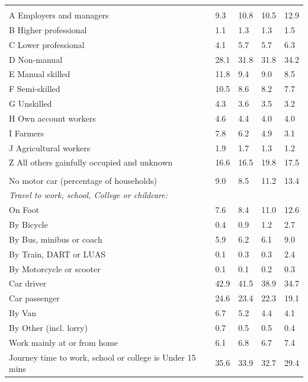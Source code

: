 \documentclass{article}
\begin{document}
\begin{table}[h]
\begin{tabular}{KTTTT}
\hline
    \\ 
    \hline
A Employers and managers &  9.3& 10.8& 10.5& 12.9\\
B Higher professional & 1.1& 1.3& 1.3& 1.5\\
C Lower professional & 4.1& 5.7& 5.7& 6.3\\
D Non-manual & 28.1& 31.8& 31.8& 34.2\\
E Manual skilled & 11.8&  9.4&  9.0&  8.5\\
F Semi-skilled & 10.5&  8.6&  8.2&  7.7\\
G Unskilled & 4.3& 3.6& 3.5& 3.2\\
H Own account workers & 4.6& 4.4& 4.0& 4.0\\
I Farmers & 7.8& 6.2& 4.9& 3.1\\
J Agricultural workers & 1.9& 1.7& 1.3& 1.2\\
Z All others gainfully occupied and unknown & 16.6& 16.5& 19.8& 17.5\\
\hline
{}\hline
    \\ 
    \hline
No motor car (percentage of households) &  9.0&  8.5& 11.2& 
13.4\\
    \hline 
\emph{Travel to work, school, College or childcare:} & & & \\
\quad On Foot &  7.6&  8.4& 11.0& 12.6\\ 
\quad By Bicycle & 0.4& 0.9& 1.2& 2.7\\ 
\quad By Bus, minibus or coach & 5.9& 6.2& 6.1& 9.0\\
\quad By Train, DART or LUAS & 0.1& 0.3& 0.3& 2.4\\
\quad By Motorcycle or scooter & 0.1& 0.1& 0.2& 0.3\\
\quad Car driver & 42.9 & 41.5& 38.9& 34.7\\
\quad Car passenger & 24.6& 23.4& 22.3& 19.1\\
\quad By Van & 6.7& 5.2& 4.4& 4.1\\
\quad By Other (incl. lorry) & 0.7& 0.5& 0.5& 0.4\\
    \hline
Work mainly at or from home & 6.1& 6.8& 6.7& 7.4\\
Journey time to work, school or college is Under 15 mins & 35.6& 33.9& 32.7& 29.4\\

\end{tabular}
\end{table}
\end{document}
